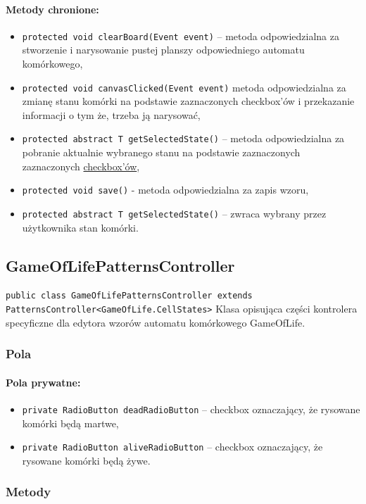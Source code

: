 \documentclass{report}
\begin{document}
\paragraph{Metody chronione:}
\begin{itemize}
 	\item \texttt{protected void clearBoard(Event event)} -- metoda odpowiedzialna za stworzenie i narysowanie pustej planszy odpowiedniego automatu komórkowego,
 	\item \texttt{protected void canvasClicked(Event event)} metoda odpowiedzialna za zmianę stanu komórki na podstawie zaznaczonych checkbox'ów i przekazanie informacji o tym że, trzeba ją narysować,
 	\item \texttt{protected abstract T getSelectedState()} -- metoda odpowiedzialna za pobranie aktualnie wybranego stanu na podstawie zaznaczonych  zaznaczonych \hyperref[sec:checkbox]{checkbox'ów},
 	\item \texttt{protected void save()} - metoda odpowiedzialna za zapis wzoru,
 	\item \texttt{protected abstract T getSelectedState()} -- zwraca wybrany przez użytkownika stan komórki.
\end{itemize}

\subsection{GameOfLifePatternsController}
\texttt{public class GameOfLifePatternsController extends PatternsController<GameOfLife.CellStates>}
Klasa opisująca części kontrolera specyficzne dla edytora wzorów automatu komórkowego GameOfLife.
\subsubsection{Pola}
\paragraph{Pola prywatne:}
\begin{itemize}	\label{sec:checkbox}
	\item \texttt{private RadioButton deadRadioButton} -- checkbox oznaczający, że rysowane komórki będą martwe,
	\item \texttt{private RadioButton aliveRadioButton} -- checkbox oznaczający, że rysowane komórki będą żywe.
\end{itemize}

\subsubsection{Metody}
\end{document}

